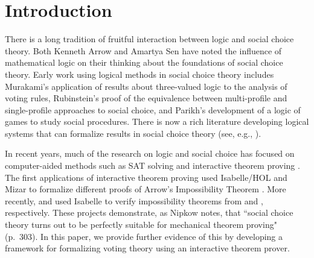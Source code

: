\documentclass[runningheads]{llncs}
\begin{document}
\section{Introduction}

There is a long tradition of fruitful interaction between logic and social choice theory.  Both Kenneth Arrow \cite[p.~154]{Arrow2014}  and Amartya Sen \cite[p.~108]{Sen2017} have noted the influence of mathematical logic on their thinking about the foundations of social choice theory.  Early work using logical methods in social choice theory includes  Murakami's  \cite{Murakami1968}  application of  results about three-valued logic to the analysis of voting rules, Rubinstein's \cite{Rubinstein1984}  proof of the equivalence between multi-profile and single-profile approaches to social choice, and Parikh's \cite{Parikh1985} development of a logic of games to study social procedures.  There is now a rich literature developing logical systems that can formalize results in social choice theory (see, e.g., \cite{Pauly2008,AgotnesVanDerHoekWooldridge2009,Nipkow2009,Tang2011,TroquardVanDerHoekWooldridge2011,Endriss2011,GrandiEndriss2013,CinaEndriss2016,PacuitYang2016,HollidayPacuit2020}). 






In recent years, much of the research on logic and social choice has focused on computer-aided methods such as SAT solving and interactive theorem proving \cite{Geist2017}.  The first applications of interactive theorem proving used Isabelle/HOL  \cite{Nipkow2009} and Mizar \cite{Wiedijk2007} to formalize different proofs of  Arrow's Impossibility Theorem \cite{Geanakoplos2005}.  More recently, \cite{Brandt2018b} and \cite{Eberl2019} used Isabelle to verify impossibility theorems from \cite{Brandt2018} and \cite{Brandl2018}, respectively.  These projects demonstrate, as Nipkow \cite{Nipkow2009} notes,  that ``social choice theory turns out to be perfectly suitable for mechanical theorem proving" (p.~303).  In this paper, we provide further evidence of this by developing a framework for formalizing voting theory using an interactive theorem prover. 
\end{document}
